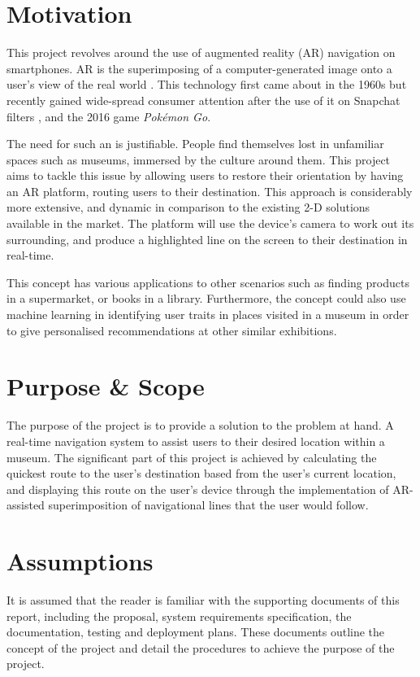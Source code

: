 \section{Motivation}
This project revolves around the use of augmented reality (AR) navigation on smartphones. AR is the superimposing of a computer-generated image onto a user's view of the real world \cite{oxforddict}. This technology first came about in the 1960s \cite{InteractionDesign} but recently gained wide-spread consumer attention after the use of it on Snapchat filters \cite{Snapchat}, and the 2016 game \textit{Pokémon Go}. 

The need for such an  is justifiable. People find themselves lost in unfamiliar spaces such as museums, immersed by the culture around them. This project aims to tackle this issue by allowing users to restore their orientation by having an AR platform, routing users to their destination. This approach is considerably more extensive, and dynamic in comparison to the existing 2-D solutions available in the market. The platform will use the device's camera to work out its surrounding, and produce a highlighted line on the screen to their destination in real-time.

This concept has various applications to other scenarios such as finding products in a supermarket, or books in a library. Furthermore, the concept could also use machine learning in identifying user traits in places visited in a museum in order to give personalised recommendations at other similar exhibitions.

\section{Purpose \& Scope}
The purpose of the project is to provide a solution to the problem at hand. A real-time navigation system to assist users to their desired location within a museum. The significant part of this project is achieved by calculating the quickest route to the user's destination based from the user's current location, and displaying this route on the user's device through the implementation of AR-assisted superimposition of navigational lines that the user would follow.

\section{Assumptions}
It is assumed that the reader is familiar with the supporting documents of this report, including the proposal, system requirements specification, the documentation, testing and deployment plans. These documents outline the concept of the project and detail the procedures to achieve the purpose of the project.

